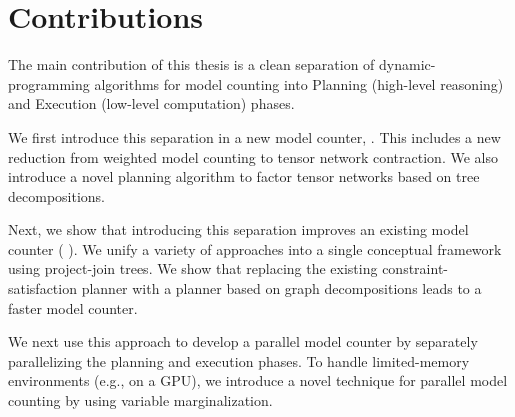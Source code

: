
\section{Contributions}
The main contribution of this thesis is a clean separation of dynamic-programming algorithms for model counting into
Planning (high-level reasoning) and Execution (low-level computation) phases.

We first introduce this separation in a new model counter, . This includes a new reduction from weighted model counting to tensor network contraction. We also introduce a novel planning algorithm to factor tensor networks based on tree decompositions.

Next, we show that introducing this separation improves an existing model counter ( \cite{DPV20}). We unify a variety of approaches into a single conceptual framework using project-join trees. We show that replacing the existing constraint-satisfaction planner with a planner based on graph decompositions leads to a faster model counter.

We next use this approach to develop a parallel model counter by separately parallelizing the planning and execution phases. To handle limited-memory environments (e.g., on a GPU), we introduce a novel technique for parallel model counting by using variable marginalization.

